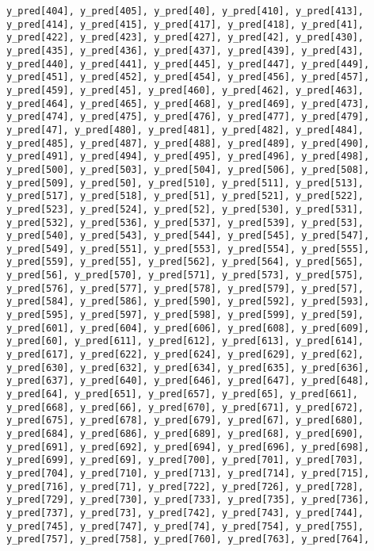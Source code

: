 \documentclass[
  letterpaper,
  DIV=11,
  numbers=noendperiod]{scrartcl}
\begin{document}
\begin{verbatim}
y_pred[404], y_pred[405], y_pred[40], y_pred[410], y_pred[413],
y_pred[414], y_pred[415], y_pred[417], y_pred[418], y_pred[41],
y_pred[422], y_pred[423], y_pred[427], y_pred[42], y_pred[430],
y_pred[435], y_pred[436], y_pred[437], y_pred[439], y_pred[43],
y_pred[440], y_pred[441], y_pred[445], y_pred[447], y_pred[449],
y_pred[451], y_pred[452], y_pred[454], y_pred[456], y_pred[457],
y_pred[459], y_pred[45], y_pred[460], y_pred[462], y_pred[463],
y_pred[464], y_pred[465], y_pred[468], y_pred[469], y_pred[473],
y_pred[474], y_pred[475], y_pred[476], y_pred[477], y_pred[479],
y_pred[47], y_pred[480], y_pred[481], y_pred[482], y_pred[484],
y_pred[485], y_pred[487], y_pred[488], y_pred[489], y_pred[490],
y_pred[491], y_pred[494], y_pred[495], y_pred[496], y_pred[498],
y_pred[500], y_pred[503], y_pred[504], y_pred[506], y_pred[508],
y_pred[509], y_pred[50], y_pred[510], y_pred[511], y_pred[513],
y_pred[517], y_pred[518], y_pred[51], y_pred[521], y_pred[522],
y_pred[523], y_pred[524], y_pred[52], y_pred[530], y_pred[531],
y_pred[532], y_pred[536], y_pred[537], y_pred[539], y_pred[53],
y_pred[540], y_pred[543], y_pred[544], y_pred[545], y_pred[547],
y_pred[549], y_pred[551], y_pred[553], y_pred[554], y_pred[555],
y_pred[559], y_pred[55], y_pred[562], y_pred[564], y_pred[565],
y_pred[56], y_pred[570], y_pred[571], y_pred[573], y_pred[575],
y_pred[576], y_pred[577], y_pred[578], y_pred[579], y_pred[57],
y_pred[584], y_pred[586], y_pred[590], y_pred[592], y_pred[593],
y_pred[595], y_pred[597], y_pred[598], y_pred[599], y_pred[59],
y_pred[601], y_pred[604], y_pred[606], y_pred[608], y_pred[609],
y_pred[60], y_pred[611], y_pred[612], y_pred[613], y_pred[614],
y_pred[617], y_pred[622], y_pred[624], y_pred[629], y_pred[62],
y_pred[630], y_pred[632], y_pred[634], y_pred[635], y_pred[636],
y_pred[637], y_pred[640], y_pred[646], y_pred[647], y_pred[648],
y_pred[64], y_pred[651], y_pred[657], y_pred[65], y_pred[661],
y_pred[668], y_pred[66], y_pred[670], y_pred[671], y_pred[672],
y_pred[675], y_pred[678], y_pred[679], y_pred[67], y_pred[680],
y_pred[684], y_pred[686], y_pred[689], y_pred[68], y_pred[690],
y_pred[691], y_pred[692], y_pred[694], y_pred[696], y_pred[698],
y_pred[699], y_pred[69], y_pred[700], y_pred[701], y_pred[703],
y_pred[704], y_pred[710], y_pred[713], y_pred[714], y_pred[715],
y_pred[716], y_pred[71], y_pred[722], y_pred[726], y_pred[728],
y_pred[729], y_pred[730], y_pred[733], y_pred[735], y_pred[736],
y_pred[737], y_pred[73], y_pred[742], y_pred[743], y_pred[744],
y_pred[745], y_pred[747], y_pred[74], y_pred[754], y_pred[755],
y_pred[757], y_pred[758], y_pred[760], y_pred[763], y_pred[764],

\end{verbatim}
\end{document}
